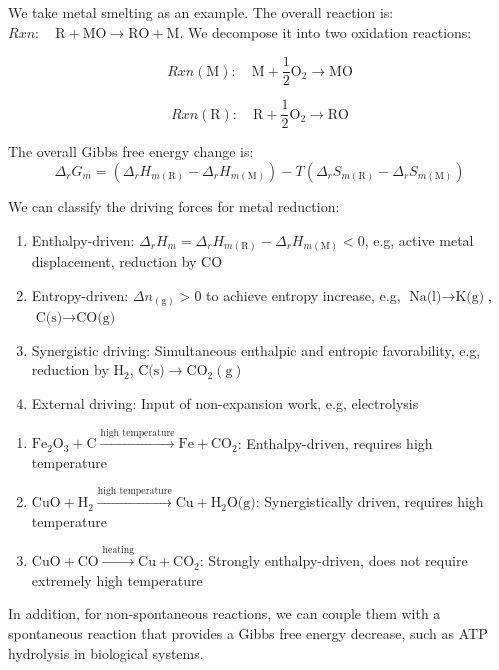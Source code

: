 We take metal smelting as an example. The overall reaction is: $Rxn: \quad \text{R} + \text{MO} \longrightarrow \text{RO} + \text{M}$. We decompose it into two oxidation reactions:

$$Rxn(\text{M}): \quad \text{M} + \frac{1}{2}\text{O}_2 \longrightarrow \text{MO}$$

$$Rxn(\text{R}): \quad \text{R} + \frac{1}{2}\text{O}_2 \longrightarrow \text{RO}$$

The overall Gibbs free energy change is:
$$\Delta_r G_m = \left( \Delta_r H_{m(\text{R})} - \Delta_r H_{m(\text{M})} \right) - T\left( \Delta_r S_{m(\text{R})} - \Delta_r S_{m(\text{M})} \right)$$

We can classify the driving forces for metal reduction:
\begin{enumerate}
  \item Enthalpy-driven: $\Delta_r H_m = \Delta_r H_{m(\text{R})} - \Delta_r H_{m(\text{M})}<0$, e.g, active metal displacement, reduction by CO
  \item Entropy-driven: $\Delta n_{(\text{g})} > 0$ to achieve entropy increase, e.g, $\text{Na(l)} \to \text{K(g)}$, $\text{C(s)} \to \text{CO(g)}$
  \item Synergistic driving: Simultaneous enthalpic and entropic favorability, e.g, reduction by $\text{H}_2$, $\text{C(s)} \to \text{CO}_2(\text{g})$
  \item External driving: Input of non-expansion work, e.g, electrolysis
\end{enumerate}

\begin{example}
  \begin{enumerate}
    \item $\text{Fe}_2\text{O}_3 + \text{C} \xrightarrow{\text{high temperature}} \text{Fe} + \text{CO}_2$: Enthalpy-driven, requires high temperature
    \item $\text{CuO} + \text{H}_2 \xrightarrow{\text{high temperature}} \text{Cu} + \text{H}_2\text{O(g)}$: Synergistically driven, requires high temperature
    \item $\text{CuO} + \text{CO} \xrightarrow{\text{heating}} \text{Cu} + \text{CO}_2$: Strongly enthalpy-driven, does not require extremely high temperature
  \end{enumerate}
\end{example}

In addition, for non-spontaneous reactions, we can couple them with a spontaneous reaction that provides a Gibbs free energy decrease, such as ATP hydrolysis in biological systems.

